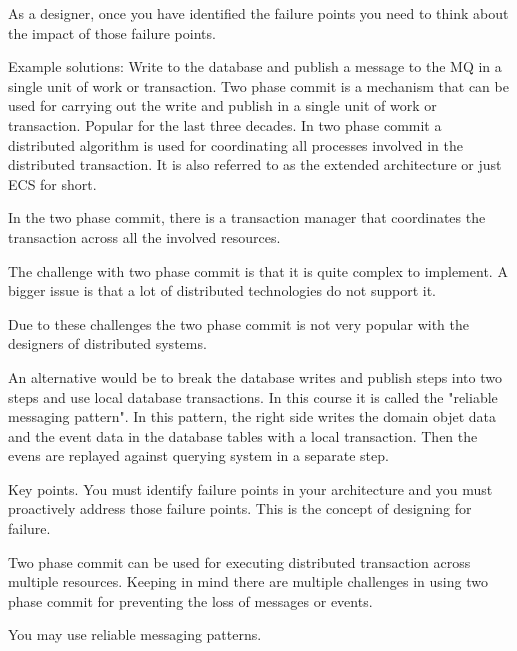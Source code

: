 As a designer, once you have identified the failure points you need to think about the impact of those failure points.

Example solutions:
Write to the database and publish a message to the MQ in a single unit of work or transaction.
Two phase commit is a mechanism that can be used for carrying out the write and publish in a single unit of work or transaction.
Popular for the last three decades.
In two phase commit a distributed algorithm is used for coordinating all processes involved in the distributed transaction.
It is also referred to as the extended architecture or just ECS for short.

In the two phase commit, there is a transaction manager that coordinates the transaction across all the involved resources.

The challenge with two phase commit is that it is quite complex to implement.
A bigger issue is that a lot of distributed technologies do not support it.

Due to these challenges the two phase commit is not very popular with the designers of distributed systems.


An alternative would be to break the database writes and publish steps into two steps and use local database transactions.
In this course it is called the "reliable messaging pattern".
In this pattern, the right side writes the domain objet data and the event data in the database tables with a local transaction.
Then the evens are replayed against querying system in a separate step.

Key points.
You must identify failure points in your architecture and you must proactively address those failure points.
This is the concept of designing for failure.

Two phase commit can be used for executing distributed transaction across multiple resources.
Keeping in mind there are multiple challenges in using two phase commit for preventing the loss of messages or events.

You may use reliable messaging patterns.

